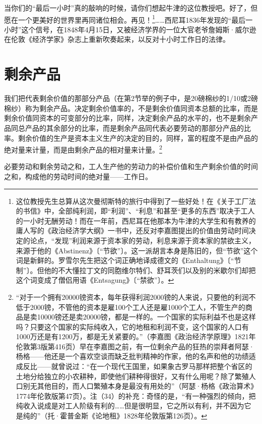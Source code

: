 \documentclass{ctexbook}
\begin{document}
    当你们的“最后一小时”真的敲响的时候，请你们想起牛津的这位教授吧。好了，但愿在一个更美好的世界里再同诸位相会。再见！\footnote{这位教授先生总算从这次曼彻斯特的旅行中得到了一些好处！在《关于工厂法的书信》中，全部纯利润，即“利润”、“利息”和甚至“更多的东西”取决于工人的一小时无酬劳动！而在一年前，西尼耳在他那本为牛津的大学生和有教养的庸人写的《政治经济学大纲》一书中，还反对李嘉图提出的价值由劳动时间决定的论点，“发现”利润来源于资本家的劳动，利息来源于资本家的禁欲主义，来源于他的《Abstinenz》〔“节欲”〕。这一派胡言本身是陈旧的，但“节欲”这个词是新鲜的。罗雪尔先生把这个词正确地译成德文的《Enthaltung》〔“节制”〕。但他的不大懂拉丁文的同胞维尔特们、舒耳茨们以及别的米歇尔们却把这个词变成了僧侣用语《Entsagung》〔“禁欲”〕。}……西尼耳1836年发现的“最后一小时”这个信号，在1848年4月15日，又被经济学界的一位大官老爷詹姆斯·威尔逊在伦敦《经济学家》杂志上重新吹奏起来，以反对十小时工作日的法律。

    \section{剩余产品}

    我们把代表剩余价值的那部分产品（在第2节举的例子中，是20磅棉纱的1/10或2磅棉纱）称为剩余产品。决定剩余价值率的，不是剩余价值同资本总额的比率，而是剩余价值同资本的可变部分的比率，同样，决定剩余产品的水平的，也不是剩余产品同总产品的其余部分的比率，而是剩余产品同代表必要劳动的那部分产品的比率。剩余价值的生产是资本主义生产的决定的目的，同样，富的程度不是由产品的绝对量来计量，而是由剩余产品的相对量来计量。\footnote{“对于一个拥有20000镑资本，每年获得利润2000镑的人来说，只要他的利润不低于2000镑，不管他的资本是雇100个工人还是雇1000个工人，不管生产的商品是卖10000镑还是卖20000镑，都是一样的。一个国家的实际利益不也是这样吗？只要这个国家的实际纯收入，它的地租和利润不变，这个国家的人口有1000万还是有1200万，都是无关紧要的。”（李嘉图《政治经济学原理》1821年伦敦第3版第416页）早在李嘉图之前，有一位剩余产品的狂热的崇拜者阿瑟·杨格——他还是一个喜欢空谈而缺乏批判精神的作家，他的名声和他的功绩适成反比——就曾说过：“在一个现代王国里，如果象古罗马那样把整个省区的土地分给独立的小农耕种，即使他们耕种得很好，又有什么用呢？除了繁殖人口别无其他目的，而人口繁殖本身是最没有用处的”（阿瑟·杨格《政治算术》1774年伦敦版第47页）。注（34）的补充：奇怪的是，“有一种强烈的倾向，把纯收入说成是对工人阶级有利的……但是很明显，它之所以有利，并不因为它是纯的”（托·霍普金斯《论地租》1828年伦敦版第126页）。}

    必要劳动和剩余劳动之和，工人生产他的劳动力的补偿价值和生产剩余价值的时间之和，构成他的劳动时间的绝对量——工作日。
\end{document}
